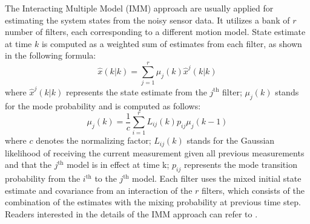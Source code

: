 \documentclass[letterpaper, 10 pt, conference]{ieeeconf}
\begin{document}
	The Interacting Multiple Model (IMM) approach are usually applied for estimating the system states from the noisy sensor data.
	It utilizes a bank of $r$ number of filters, each corresponding to a different motion model.
	State estimate at time $k$ is computed as a weighted sum of estimates from each filter, as shown in the following formula:
	\begin{equation}
	\hat{x}(k|k)=\sum\limits_{j=1}^{r}\mu_j(k)\hat{x}^j(k|k) \label{eqn:imm_eq}
	\end{equation}
	where $\hat{x}^j(k|k)$ represents the state estimate from the $j^\text{th}$ filter; $\mu_j(k)$ stands for the mode probability and is computed as follows:
	\[
	\mu_j(k)=\frac{1}{c}\sum\limits_{i=1}^{r}L_{ij}(k)p_{ij}\mu_j(k-1)
	\]
	where $c$ denotes the normalizing factor; $L_{ij}(k)$ stands for the Gaussian likelihood of receiving the current measurement given all previous measurements and that the $j^\text{th}$ model is in effect at time k; $p_{ij}$ represents the mode transition probability from the $i^\text{th}$ to the $j^\text{th}$ model. 
	Each filter uses the mixed initial state estimate and covariance from an interaction of the $r$ filters, which consists of the combination of the estimates with the mixing probability at previous time step.
	Readers interested in the details of the IMM approach can refer to \cite{yaakov2001estimation}.
	
\end{document}
